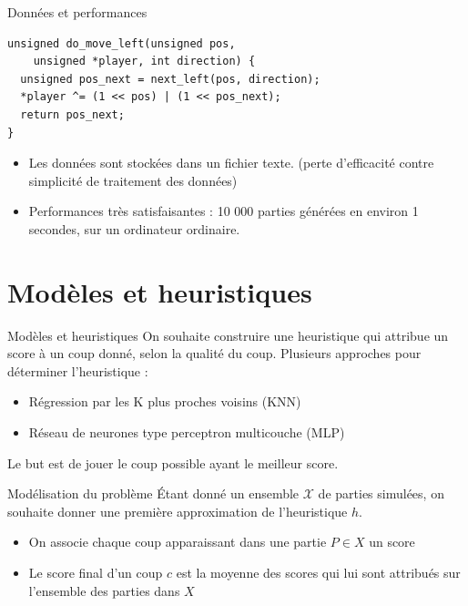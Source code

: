 \documentclass{beamer}
\begin{document}
\begin{frame}[fragile]{Données et performances}
    \begin{verbatim}
unsigned do_move_left(unsigned pos,
    unsigned *player, int direction) {
  unsigned pos_next = next_left(pos, direction);
  *player ^= (1 << pos) | (1 << pos_next);
  return pos_next;
}
    \end{verbatim}
    \begin{itemize}
        \item Les données sont stockées dans un fichier texte. \newline
              (perte d'efficacité contre simplicité de traitement des données)
        \item Performances très satisfaisantes : \newline
              \alert{10 000} parties générées en environ \alert{1 secondes}, sur un ordinateur ordinaire.
    \end{itemize}
\end{frame}

{\section{Modèles et heuristiques}}

\begin{frame}{Modèles et heuristiques}
    On souhaite construire une heuristique qui attribue un \alert{score} à un coup donné, selon la \alert{qualité} du coup.
    Plusieurs approches pour déterminer l'heuristique :
    \begin{itemize}
        \item Régression par les K plus proches voisins (KNN)
        \item Réseau de neurones type perceptron multicouche (MLP)
    \end{itemize}
    Le but est de jouer le coup possible ayant le meilleur score.
\end{frame}

\begin{frame}{Modélisation du problème}
    Étant donné un ensemble $\mathcal{X}$ de parties simulées,
    on souhaite donner une première approximation de l'heuristique $h$.
    \begin{itemize}
        \item On associe chaque coup apparaissant dans une partie $P \in X$ un score
        \item Le score final d'un coup $c$ est la moyenne des scores qui lui sont attribués sur l'ensemble des parties dans $X$
    \end{itemize}
\end{frame}
\end{document}
